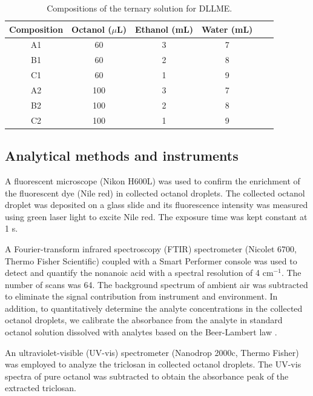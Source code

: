 \documentclass[a4paper,fleqn]{cas-dc}
\begin{document}
\begin{sloppypar}
\begin{table}[htbp]
 \begin{threeparttable}
 \caption{Compositions of the ternary solution for DLLME.}
 \begin{tabular*}{1\textwidth}{@{\extracolsep{\fill}}cccccc}
\hline
Composition & Octanol ($\mu$L) & Ethanol (mL) & Water (mL) \\
\hline
A1          & 60           & 3            & 7          \\
B1          & 60           & 2            & 8          \\
C1          & 60           & 1            & 9          \\
A2          & 100          & 3            & 7          \\
B2          & 100          & 2            & 8          \\
C2          & 100          & 1            & 9 \\       
\hline
\end{tabular*}
\end{threeparttable}
\end{table}

\subsection{Analytical methods and instruments}
A ﬂuorescent microscope (Nikon H600L) was used to confirm the enrichment of the fluorescent dye (Nile red) in collected octanol droplets. The collected octanol droplet was deposited on a glass slide and its fluorescence intensity was measured using green laser light to excite Nile red. The exposure time was kept constant at 1 s.

A Fourier-transform infrared spectroscopy (FTIR) spectrometer (Nicolet 6700, Thermo Fisher Scientific) coupled with a Smart Performer console was used to detect and quantify the nonanoic acid with a spectral resolution of 4 cm$^{-1}$. The number of scans was 64. The background spectrum of ambient air was subtracted to eliminate the signal contribution from instrument and environment. In addition, to quantitatively determine the analyte concentrations in the collected octanol droplets, we calibrate the absorbance from the analyte in standard octanol solution dissolved with analytes based on the Beer-Lambert law \cite{wagner2010use}.

An ultraviolet-visible (UV-vis) spectrometer (Nanodrop 2000c, Thermo Fisher) was employed to analyze the triclosan in collected octanol droplets. The UV-vis spectra of pure octanol was subtracted to obtain the absorbance peak of the extracted triclosan. %




\end{sloppypar}
\end{document}
